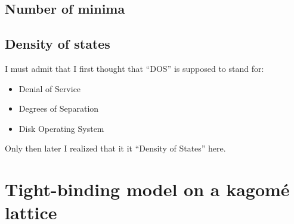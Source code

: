 \documentclass[11pt, english, fleqn, DIV=15, headinclude, BCOR=1cm]{scrartcl}
\begin{document}
\subsection{Number of minima}

\subsection{Density of states}

I must admit that I first thought that “DOS” is supposed to stand for:

\begin{itemize}
    \item Denial of Service
    \item Degrees of Separation
    \item Disk Operating System
\end{itemize}

Only then later I realized that it it “Density of States” here.

\section{Tight-binding model on a kagomé lattice}
\label{homework:2}
\end{document}
